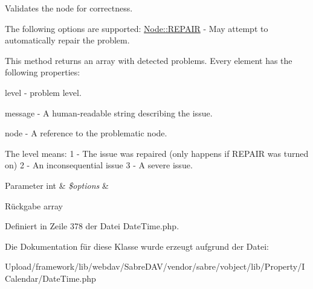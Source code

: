 Validates the node for correctness.

The following options are supported\+: \mbox{\hyperlink{class_sabre_1_1_v_object_1_1_node_ac97a7fb85c1f871523336cd1ec6b29a9}{Node\+::\+R\+E\+P\+A\+IR}} -\/ May attempt to automatically repair the problem.

This method returns an array with detected problems. Every element has the following properties\+:


\begin{DoxyItemize}
\item level -\/ problem level.
\item message -\/ A human-\/readable string describing the issue.
\item node -\/ A reference to the problematic node.
\end{DoxyItemize}

The level means\+: 1 -\/ The issue was repaired (only happens if R\+E\+P\+A\+IR was turned on) 2 -\/ An inconsequential issue 3 -\/ A severe issue.


\begin{DoxyParams}[1]{Parameter}
int & {\em \$options} & \\
\hline
\end{DoxyParams}
\begin{DoxyReturn}{Rückgabe}
array 
\end{DoxyReturn}


Definiert in Zeile 378 der Datei Date\+Time.\+php.



Die Dokumentation für diese Klasse wurde erzeugt aufgrund der Datei\+:\begin{DoxyCompactItemize}
\item 
Upload/framework/lib/webdav/\+Sabre\+D\+A\+V/vendor/sabre/vobject/lib/\+Property/\+I\+Calendar/Date\+Time.\+php\end{DoxyCompactItemize}
